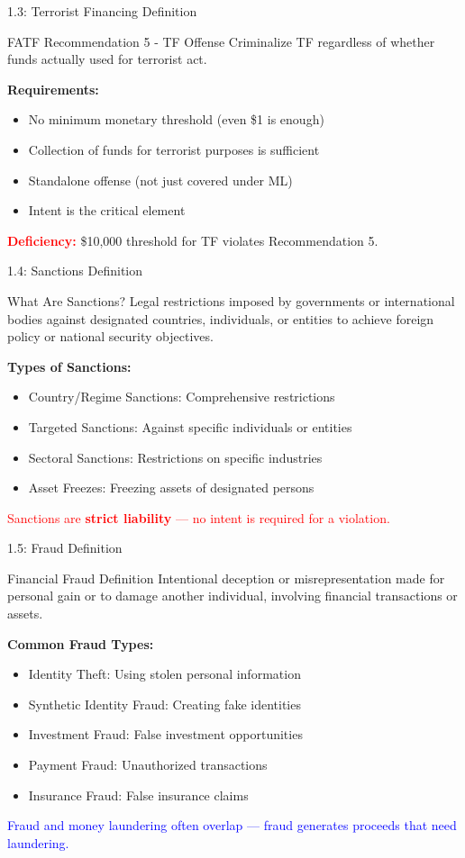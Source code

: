 \documentclass{beamer}
\begin{document}
	\begin{frame}{1.3: Terrorist Financing Definition}
		\begin{block}{FATF Recommendation 5 - TF Offense}
			Criminalize TF regardless of whether funds actually used for terrorist act.
		\end{block}
		\textbf{Requirements:}
		\begin{itemize}
			\item No minimum monetary threshold (even \$1 is enough)
			\item Collection of funds for terrorist purposes is sufficient
			\item Standalone offense (not just covered under ML)
			\item Intent is the critical element
		\end{itemize}
		\textcolor{red}{\textbf{Deficiency:}} \$10,000 threshold for TF violates Recommendation 5.
	\end{frame}
	
	\begin{frame}{1.4: Sanctions Definition}
		\begin{block}{What Are Sanctions?}
			Legal restrictions imposed by governments or international bodies against designated countries, individuals, or entities to achieve foreign policy or national security objectives.
		\end{block}
		\textbf{Types of Sanctions:}
		\begin{itemize}
			\item Country/Regime Sanctions: Comprehensive restrictions
			\item Targeted Sanctions: Against specific individuals or entities
			\item Sectoral Sanctions: Restrictions on specific industries
			\item Asset Freezes: Freezing assets of designated persons
		\end{itemize}
		\textcolor{red}{Sanctions are \textbf{strict liability} — no intent is required for a violation.}
	\end{frame}
	
	\begin{frame}{1.5: Fraud Definition}
		\begin{block}{Financial Fraud Definition}
			Intentional deception or misrepresentation made for personal gain or to damage another individual, involving financial transactions or assets.
		\end{block}
		\textbf{Common Fraud Types:}
		\begin{itemize}
			\item Identity Theft: Using stolen personal information
			\item Synthetic Identity Fraud: Creating fake identities
			\item Investment Fraud: False investment opportunities
			\item Payment Fraud: Unauthorized transactions
			\item Insurance Fraud: False insurance claims
		\end{itemize}
		\textcolor{blue}{Fraud and money laundering often overlap — fraud generates proceeds that need laundering.}
	\end{frame}
	
\end{document}
